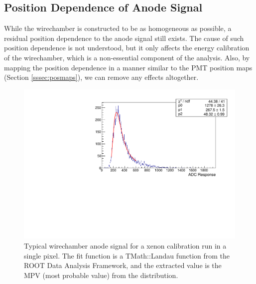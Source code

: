 \subsection{Position Dependence of Anode Signal}

While the wirechamber is constructed to be as homogeneous as possible, a residual
position dependence to the anode signal still exists. The cause of such position dependence is not understood,
but it only affects the energy calibration of the wirechamber, which is
a non-essential component of the analysis. Also, by mapping the position dependence in a manner
similar to the PMT position maps (Section \ref{sssec:posmaps}), we can remove any effects altogether.

\begin{figure}[h]
  \centering
  \includegraphics[scale=0.5,page=1]{4-UCNACalibrations/MWPCPositionMapSpectrum.pdf}
  \caption{Typical wirechamber anode signal for a xenon calibration run in a
    single pixel. The fit function is a TMath::Landau function from the ROOT Data Analysis
    Framework, and the extracted value is the MPV (most probable value) from the
    distribution.}
  \label{fig:xenonMWPCsignal}
\end{figure}

